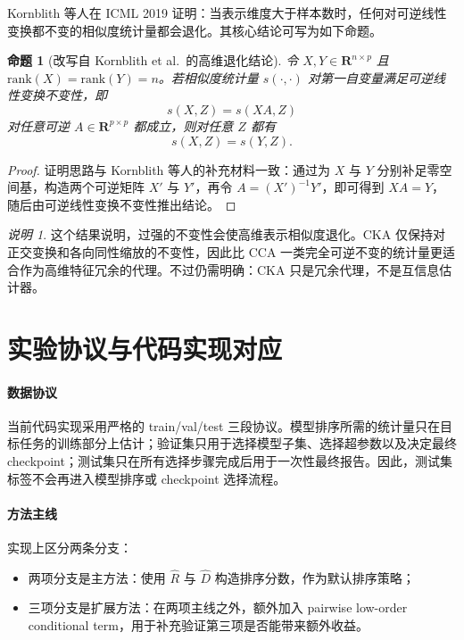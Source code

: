 \documentclass[UTF8,fontset=fandol]{ctexart}
\newtheorem{proposition}{命题}
\theoremstyle{remark}
\newtheorem{remark}{说明}
\begin{document}
Kornblith 等人在 ICML 2019 证明：当表示维度大于样本数时，任何对可逆线性变换都不变的相似度统计量都会退化。其核心结论可写为如下命题。

\begin{proposition}[改写自 Kornblith et al.\ 的高维退化结论]
令 $X, Y \in \bm{R}^{n \times p}$ 且 $\mathrm{rank}(X) = \mathrm{rank}(Y) = n$。若相似度统计量 $s(\cdot, \cdot)$ 对第一自变量满足可逆线性变换不变性，即
\[
s(X, Z) = s(XA, Z)
\]
对任意可逆 $A \in \bm{R}^{p \times p}$ 都成立，则对任意 $Z$ 都有
\[
s(X, Z) = s(Y, Z).
\]
\end{proposition}

\begin{proof}
证明思路与 Kornblith 等人的补充材料一致：通过为 $X$ 与 $Y$ 分别补足零空间基，构造两个可逆矩阵 $X'$ 与 $Y'$，再令 $A = (X')^{-1}Y'$，即可得到 $XA = Y$，随后由可逆线性变换不变性推出结论。
\end{proof}

\begin{remark}
这个结果说明，过强的不变性会使高维表示相似度退化。CKA 仅保持对正交变换和各向同性缩放的不变性，因此比 CCA 一类完全可逆不变的统计量更适合作为高维特征冗余的代理。不过仍需明确：CKA 只是冗余代理，不是互信息估计器。
\end{remark}

\section{实验协议与代码实现对应}

\paragraph{数据协议}
当前代码实现采用严格的 train/val/test 三段协议。模型排序所需的统计量只在目标任务的训练部分上估计；验证集只用于选择模型子集、选择超参数以及决定最终 checkpoint；测试集只在所有选择步骤完成后用于一次性最终报告。因此，测试集标签不会再进入模型排序或 checkpoint 选择流程。

\paragraph{方法主线}
实现上区分两条分支：
\begin{itemize}
    \item 两项分支是主方法：使用 $\widehat R$ 与 $\widehat D$ 构造排序分数，作为默认排序策略；
    \item 三项分支是扩展方法：在两项主线之外，额外加入 pairwise low-order conditional term，用于补充验证第三项是否能带来额外收益。
\end{itemize}
\end{document}
